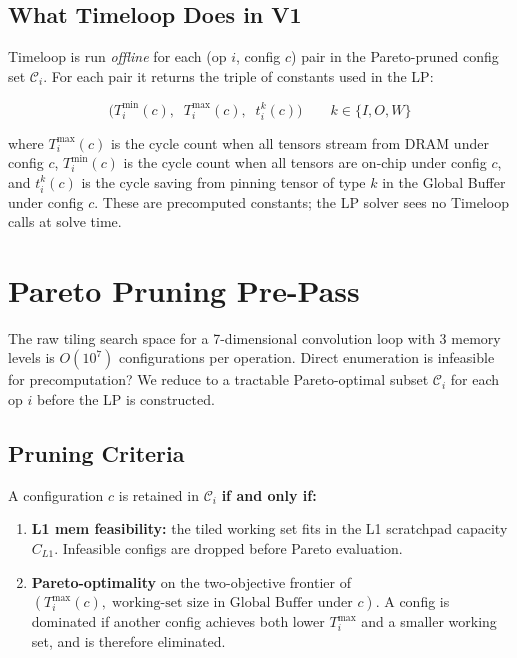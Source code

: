 \documentclass{article}
\begin{document}
\subsection{What Timeloop Does in V1}

Timeloop is run \textit{offline} for each (op $i$, config $c$) pair in the Pareto-pruned
config set $\mathcal{C}_i$. For each pair it returns the triple of constants used in the LP:

\[
  \bigl(T_i^{\min}(c),\;\; T_i^{\max}(c),\;\; t_i^k(c)\bigr)
  \qquad k \in \{I, O, W\}
\]

where $T_i^{\max}(c)$ is the cycle count when all tensors stream from DRAM under config $c$,
$T_i^{\min}(c)$ is the cycle count when all tensors are on-chip under config $c$, and
$t_i^k(c)$ is the cycle saving from pinning tensor of type $k$ in the Global Buffer under
config $c$. These are precomputed constants; the LP solver sees no Timeloop calls at solve
time.

\section{Pareto Pruning Pre-Pass}

The raw tiling search space for a 7-dimensional convolution loop with 3 memory levels is
$O(10^{7})$ configurations per operation. Direct enumeration is infeasible for precomputation?
We reduce to a tractable Pareto-optimal subset $\mathcal{C}_i$ for each op $i$ before
the LP is constructed.

\subsection{Pruning Criteria}

A configuration $c$ is retained in $\mathcal{C}_i$ \textbf{if and only if:}

\begin{enumerate}[noitemsep]
  \item \textbf{L1 mem feasibility:} the tiled working set fits in the L1 scratchpad capacity
        $C_{L1}$. Infeasible configs are dropped before Pareto evaluation.
  \item \textbf{Pareto-optimality} on the two-objective frontier of
        $(T_i^{\max}(c),\; \text{working-set size in Global Buffer under }c)$.
        A config is dominated if another config achieves both lower $T_i^{\max}$ and
        a smaller working set, and is therefore eliminated.
\end{enumerate}
\end{document}
